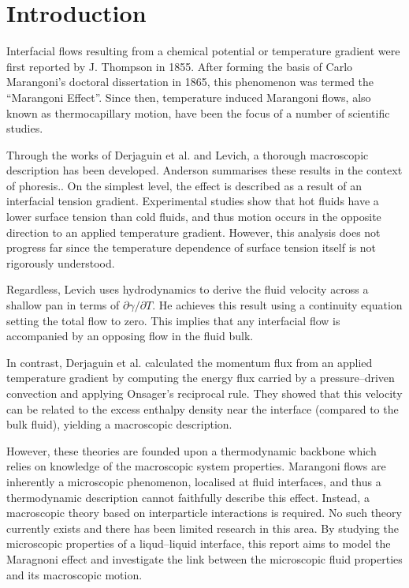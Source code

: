 \section{Introduction}
Interfacial flows resulting from a chemical potential or temperature gradient were first reported by J. Thompson in 1855.\cite{JThompson}
After forming the basis of Carlo Marangoni's doctoral dissertation in 1865, this phenomenon was termed the ``Marangoni Effect''.\cite{Marangoni}
Since then, temperature induced Marangoni flows, also known as thermocapillary motion, have been the focus of a number of scientific studies.

Through the works of Derjaguin et al.\cite{SurfaceForces} and Levich\cite{Levich}, a thorough macroscopic description has been developed.
Anderson summarises these results in the context of phoresis.\cite{Anderson}.
On the simplest level, the effect is described as a result of an interfacial tension gradient.
Experimental studies show that hot fluids have a lower surface tension than cold fluids,\cite{Ficalbi1972,Kayser1975} and thus motion occurs in the opposite direction to an applied temperature gradient.
However, this analysis does not progress far since the temperature dependence of surface tension itself is not rigorously understood.

Regardless, Levich uses hydrodynamics to derive the fluid velocity across a shallow pan in terms of $\partial \gamma / \partial T$.
He achieves this result using a continuity equation setting the total flow to zero.
This implies that any interfacial flow is accompanied by an opposing flow in the fluid bulk.

In contrast, Derjaguin et al. calculated the momentum flux from an applied temperature gradient by computing the energy flux carried by a pressure--driven convection and applying Onsager's reciprocal rule.\cite{SurfaceForces}
They showed that this velocity can be related to the excess enthalpy density near the interface (compared to the bulk fluid), yielding a macroscopic description.

However, these theories are founded upon a thermodynamic backbone which relies on knowledge of the macroscopic system properties.
Marangoni flows are inherently a microscopic phenomenon, localised at fluid interfaces, and thus a thermodynamic description cannot faithfully describe this effect.
Instead, a macroscopic theory based on interparticle interactions is required.
No such theory currently exists and there has been limited research in this area.\cite{HolgerBoppHampe}
By studying the microscopic properties of a liqud--liquid interface, this report aims to model the Maragnoni effect and investigate the link between the microscopic fluid properties and its macroscopic motion.

